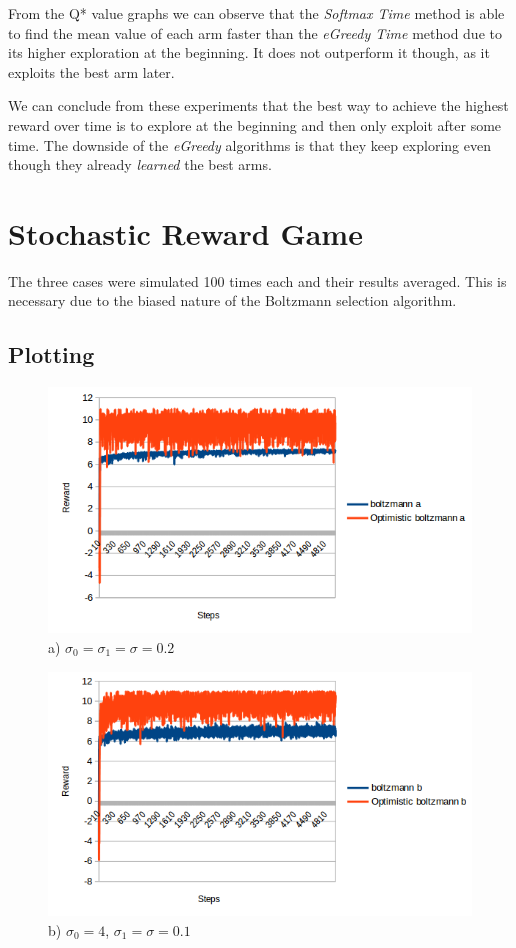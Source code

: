\documentclass[a4paper, 11pt]{article}
\begin{document}
From the Q* value graphs we can observe that the \textit{Softmax Time} method is able to find the mean value of each arm faster than the \textit{eGreedy Time} method due to its higher exploration at the beginning. It does not outperform it though, as it exploits the best arm later.

We can conclude from these experiments that the best way to achieve the highest reward over time is to explore at the beginning and then only exploit after some time. The downside of the \textit{eGreedy} algorithms is that they keep exploring even though they already \textit{learned} the best arms.


\newpage
\section{Stochastic Reward Game}

The three cases were simulated 100 times each and their results averaged. This is necessary due to the biased nature of the Boltzmann selection algorithm.

\subsection{Plotting}
\begin{figure}[H]
	\centering
	\caption{a) $\sigma_0 = \sigma_1 = \sigma = 0.2$}
    \includegraphics[width=1\linewidth]{ex2_a}
\end{figure}

\begin{figure}[H]
	\centering
	\caption{b) $\sigma_0 = 4$, $\sigma_1 = \sigma = 0.1$}
    \includegraphics[width=1\linewidth]{ex2_b}
\end{figure}
\end{document}
